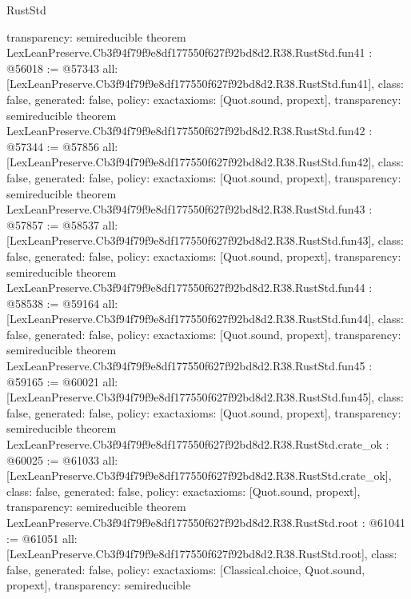 \begin{lexlean}{RustStd}
\begin{coremodule}
{  transparency: semireducible
}
theorem LexLeanPreserve.Cb3f94f79f9e8df177550f627f92bd8d2.R38.RustStd.fun41 : @56018 := @57343 {
  all: [LexLeanPreserve.Cb3f94f79f9e8df177550f627f92bd8d2.R38.RustStd.fun41],
  class: false,
  generated: false,
  policy: exact{axioms: [Quot.sound, propext]},
  transparency: semireducible
}
theorem LexLeanPreserve.Cb3f94f79f9e8df177550f627f92bd8d2.R38.RustStd.fun42 : @57344 := @57856 {
  all: [LexLeanPreserve.Cb3f94f79f9e8df177550f627f92bd8d2.R38.RustStd.fun42],
  class: false,
  generated: false,
  policy: exact{axioms: [Quot.sound, propext]},
  transparency: semireducible
}
theorem LexLeanPreserve.Cb3f94f79f9e8df177550f627f92bd8d2.R38.RustStd.fun43 : @57857 := @58537 {
  all: [LexLeanPreserve.Cb3f94f79f9e8df177550f627f92bd8d2.R38.RustStd.fun43],
  class: false,
  generated: false,
  policy: exact{axioms: [Quot.sound, propext]},
  transparency: semireducible
}
theorem LexLeanPreserve.Cb3f94f79f9e8df177550f627f92bd8d2.R38.RustStd.fun44 : @58538 := @59164 {
  all: [LexLeanPreserve.Cb3f94f79f9e8df177550f627f92bd8d2.R38.RustStd.fun44],
  class: false,
  generated: false,
  policy: exact{axioms: [Quot.sound, propext]},
  transparency: semireducible
}
theorem LexLeanPreserve.Cb3f94f79f9e8df177550f627f92bd8d2.R38.RustStd.fun45 : @59165 := @60021 {
  all: [LexLeanPreserve.Cb3f94f79f9e8df177550f627f92bd8d2.R38.RustStd.fun45],
  class: false,
  generated: false,
  policy: exact{axioms: [Quot.sound, propext]},
  transparency: semireducible
}
theorem LexLeanPreserve.Cb3f94f79f9e8df177550f627f92bd8d2.R38.RustStd.crate_ok : @60025 := @61033 {
  all: [LexLeanPreserve.Cb3f94f79f9e8df177550f627f92bd8d2.R38.RustStd.crate_ok],
  class: false,
  generated: false,
  policy: exact{axioms: [Quot.sound, propext]},
  transparency: semireducible
}
theorem LexLeanPreserve.Cb3f94f79f9e8df177550f627f92bd8d2.R38.RustStd.root : @61041 := @61051 {
  all: [LexLeanPreserve.Cb3f94f79f9e8df177550f627f92bd8d2.R38.RustStd.root],
  class: false,
  generated: false,
  policy: exact{axioms: [Classical.choice, Quot.sound, propext]},
  transparency: semireducible
}


\end{coremodule}
\end{lexlean}
